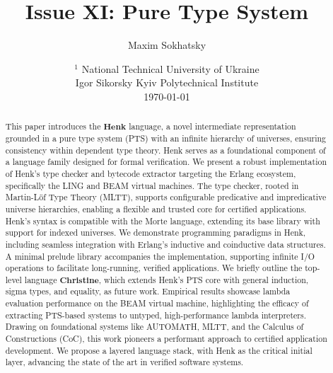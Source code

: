 \documentclass{article}
\begin{document}
\title{Issue XI: Pure Type System}
\author{Maxim Sokhatsky}
\date{ $^1$ National Technical University of Ukraine \\
       \small Igor Sikorsky Kyiv Polytechnical Institute\\
       \today }

\maketitle

\begin{abstract}
This paper introduces the $\mathbf{Henk}$ language, a novel intermediate
representation grounded in a pure type system (PTS) with an infinite
hierarchy of universes, ensuring consistency within dependent type theory.
Henk serves as a foundational component of a language family designed for
formal verification. We present a robust implementation of Henk’s type
checker and bytecode extractor targeting the Erlang ecosystem, specifically
the LING and BEAM virtual machines. The type checker, rooted in Martin-Löf
Type Theory (MLTT), supports configurable predicative and impredicative
universe hierarchies, enabling a flexible and trusted core for certified
applications. Henk’s syntax is compatible with the Morte language, extending
its base library with support for indexed universes. We demonstrate programming
paradigms in Henk, including seamless integration with Erlang’s inductive and
coinductive data structures. A minimal prelude library accompanies the
implementation, supporting infinite I/O operations to facilitate long-running,
verified applications. We briefly outline the top-level language $\mathbf{Christine}$,
which extends Henk’s PTS core with general induction, sigma types, and equality,
as future work. Empirical results showcase lambda evaluation performance on the
BEAM virtual machine, highlighting the efficacy of extracting PTS-based systems
to untyped, high-performance lambda interpreters. Drawing on foundational systems
like AUTOMATH, MLTT, and the Calculus of Constructions (CoC), this work pioneers
a performant approach to certified application development. We propose a layered
language stack, with Henk as the critical initial layer, advancing the state
of the art in verified software systems.
\end{abstract}

\ifincludeTOC
  \tableofcontents
\fi

\newpage
\end{document}

